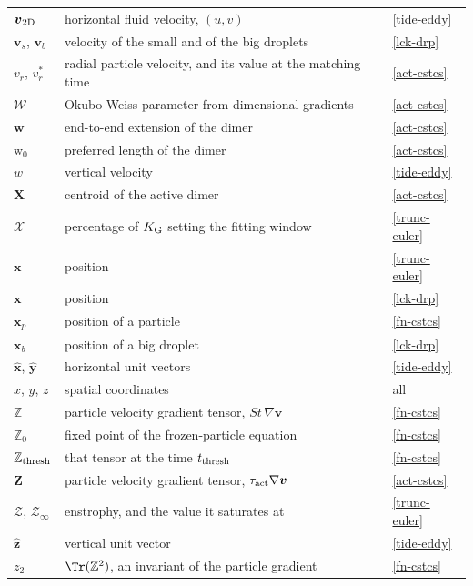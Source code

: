 \begin{longtable}{@{}p{}p{}p{}@{}}
$\boldsymbol{v}_{\rm 2D}$ & horizontal fluid velocity, $(u,v)$ & \ref{tide-eddy} \\
$\boldsymbol{v}_s$, $\boldsymbol{v}_b$ & velocity of the small and of the big droplets & \ref{lck-drp} \\
$v_r$, $v_r^*$ & radial particle velocity, and its value at the matching time & \ref{act-cstcs} \\
\addlinespace
$\mathcal{W}$ & Okubo-Weiss parameter from dimensional gradients & \ref{act-cstcs} \\
$\mathbf{w}$ & end-to-end extension of the dimer & \ref{act-cstcs} \\
$\mathrm{w}_0$ & preferred length of the dimer & \ref{act-cstcs} \\
$w$ & vertical velocity & \ref{tide-eddy} \\
\addlinespace
$\mathbf{X}$ & centroid of the active dimer & \ref{act-cstcs} \\
$\mathcal{X}$ & percentage of $K_{\rm G}$ setting the fitting window & \ref{trunc-euler} \\
$\mathbf{x}$ & position & \ref{trunc-euler} \\
$\boldsymbol{x}$ & position & \ref{lck-drp} \\
$\boldsymbol{x}_p$ & position of a particle & \ref{fn-cstcs} \\
$\boldsymbol{x}_b$ & position of a big droplet & \ref{lck-drp} \\
$\widehat{\boldsymbol{x}}$, $\widehat{\boldsymbol{y}}$ & horizontal unit vectors & \ref{tide-eddy} \\
$x$, $y$, $z$ & spatial coordinates & all \\
\addlinespace
$\mathbb{Z}$ & particle velocity gradient tensor, $St\,\nabla\boldsymbol{v}$ & \ref{fn-cstcs} \\
$\mathbb{Z}_0$ & fixed point of the frozen-particle equation & \ref{fn-cstcs} \\
$\mathbb{Z}_{\rm thresh}$ & that tensor at the time $t_{\rm thresh}$ & \ref{fn-cstcs} \\
$\mathbf{Z}$ & particle velocity gradient tensor, $\tau_{\rm act}\nabla\boldsymbol{v}$ & \ref{act-cstcs} \\
$\mathcal{Z}$, $\mathcal{Z}_\infty$ & enstrophy, and the value it saturates at & \ref{trunc-euler} \\
$\widehat{\boldsymbol{z}}$ & vertical unit vector & \ref{tide-eddy} \\
$z_2$ & $\Tr(\mathbb{Z}^2)$, an invariant of the particle gradient & \ref{fn-cstcs} \\

\end{longtable}
